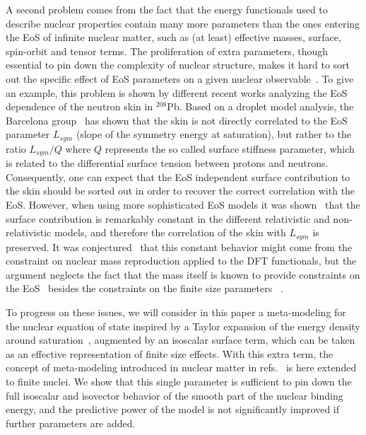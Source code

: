 \documentclass
[aps,prc,twocolumn,showpacs,showkeys,amsmath,floatfix,superscriptaddress]{revtex4}
\begin{document}
A second problem comes from the fact that the energy functionals used to describe nuclear properties contain many more parameters than the ones entering the EoS of infinite nuclear matter, such as (at least) effective masses, surface, spin-orbit and tensor terms. The proliferation of extra parameters, though essential to pin down the complexity of nuclear structure, makes it hard to sort out the specific effect of EoS parameters on a given nuclear observable~\cite{Nazarewicz14}. To give an example, this problem is  shown by different recent works analyzing the EoS dependence of the neutron skin in $^{208}$Pb. Based on a droplet model analysis, the Barcelona group~\cite{warda09} has shown that the skin is not directly correlated to the EoS parameter $L_{sym}$ (slope of the symmetry energy at saturation), 
but rather to the ratio $L_{sym}/Q$ where $Q$ represents the so called surface stiffness parameter, which is related to the differential surface tension between protons and neutrons. Consequently, one can expect that the EoS independent surface contribution to the skin should be sorted out  in order to recover the correct correlation with the EoS. However, when using more sophisticated EoS models it  was shown~\cite{Mondal,centelles10,reinhard16} that the surface contribution is remarkably constant in the different relativistic and non-relativistic models, and therefore the correlation of the skin with $L_{sym}$ is preserved. It was conjectured~\cite{centelles10} that this constant behavior might come from the constraint on nuclear mass reproduction applied to the DFT functionals, but the argument neglects the fact that the mass itself is known to provide constraints on the EoS~\cite{tsang_rep,kortelainen10,Kortelainen12} besides the constraints on the finite size parameters~\cite{Jodon} .
 
To progress on these issues, we will consider in this paper a meta-modeling for the nuclear equation of state inspired  by a Taylor expansion of the energy density around saturation~\cite{Casali1}, augmented by an isoscalar surface term, which can be taken as an effective representation of finite size effects. 
 {With this extra term, the concept of meta-modeling introduced in nuclear matter in refs.~\cite{Casali1,Casali2} is here extended to finite nuclei.}
We show that this single parameter is sufficient to pin down the full isoscalar and isovector behavior of the smooth part of the nuclear binding energy, and the predictive power of the model is not significantly improved if further parameters are added. 
\end{document}
